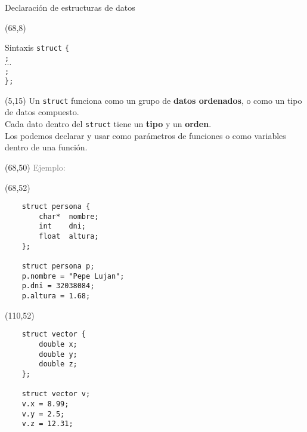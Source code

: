 \documentclass[aspectratio=169]{beamer}
\begin{document}
\begin{frame}[fragile,t]{Declaración de estructuras de datos}
    \begin{textblock}{87}(68,8)
    \begin{block}{\small Sintaxis}
    \vspace{0.2cm}
    \scriptsize
    {\large \texttt{struct}}  {\large \texttt{\{}}\\ \vspace{0.2cm}
    \hspace{2cm}  \hspace{0.2cm}  {\large \texttt{;}}\\ \vspace{0.2cm}
    \hspace{2cm} $\cdots$\\ \vspace{0.2cm}
    \hspace{2cm}  \hspace{0.2cm}  {\large \texttt{;}}\\ \vspace{0.2cm}
    \hspace{1cm} {\large \texttt{\};}}
    \end{block}
    \end{textblock}
    \begin{textblock}{55}(5,15)
    \small
    Un \texttt{struct} funciona como un grupo de \textbf{datos ordenados}, o como un tipo de datos compuesto.\\
    \bigskip
    Cada dato dentro del \texttt{struct} tiene un \textbf{tipo} y un \textbf{orden}.\\
    \bigskip
    Los podemos declarar y usar como parámetros de funciones o como variables dentro de una función.\\
    \end{textblock}
    \begin{textblock}{87}(68,50)
    \textcolor{gray}{Ejemplo:}
    \end{textblock}    
    \begin{textblock}{87}(68,52)
    \scriptsize
    \begin{verbatim}
    struct persona {
        char*  nombre;
        int    dni;
        float  altura;
    };
    
    struct persona p;
    p.nombre = "Pepe Lujan";
    p.dni = 32038084;
    p.altura = 1.68;
    \end{verbatim}
    \end{textblock}
    \begin{textblock}{87}(110,52)
    \scriptsize
    \begin{verbatim}
    struct vector {
        double x;
        double y;
        double z;
    };
    
    struct vector v;
    v.x = 8.99;
    v.y = 2.5;
    v.z = 12.31;
    \end{verbatim}
    \end{textblock}
\end{frame}
\end{document}
